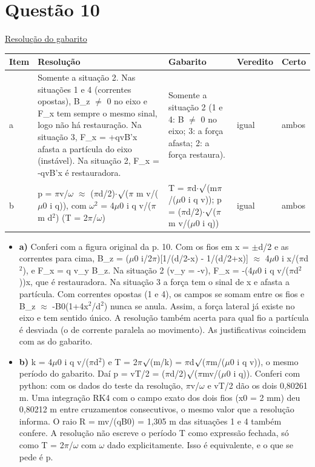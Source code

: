 \documentclass{article}%
\begin{document}
\section*{Questão 10}%
\href{https://poliedroresolve.sistemapoliedro.com.br/vestibulares/ime/2027/ime-2-fase-dia-2-27-10-2026-2-fase-dia-2/dissertativa-10-fisica-2-fase-dia-2-ime-2027}{Resolução do gabarito}\par\smallskip%
\begin{longtable}{@{}p{} p{} p{} p{} p{}@{}}\toprule Item & Resolução & Gabarito & Veredito & Certo \\ \midrule
a & Somente a situação 2. Nas situações 1 e 4 (correntes opostas), B\_z $\neq$ 0 no eixo e F\_x tem sempre o mesmo sinal, logo não há restauração. Na situação 3, F\_x = +qvB'x afasta a partícula do eixo (instável). Na situação 2, F\_x = -qvB'x é restauradora. & Somente a situação 2 (1 e 4: B $\neq$ 0 no eixo; 3: a força afasta; 2: a força restaura). & igual & ambos \\
b & p = $\pi$v/$\omega$ $\approx$ ($\pi$d/2)$\cdot$$\surd$($\pi$ m v/($\mu$0 i q)), com $\omega$$^2$ = 4$\mu$0 i q v/($\pi$ m d$^2$) (T = 2$\pi$/$\omega$) & T = $\pi$d$\cdot$$\surd$(m$\pi$/($\mu$0 i q v)); p = ($\pi$d/2)$\cdot$$\surd$($\pi$ m v/($\mu$0 i q)) & igual & ambos \\
\bottomrule\end{longtable}%
\begin{itemize}%
\item%
\textbf{a)} Conferi com a figura original da p. 10. Com os fios em x = $\pm$d/2 e as correntes para cima, B\_z = ($\mu$0 i/2$\pi$){[}1/(d/2-x) - 1/(d/2+x){]} $\approx$ 4$\mu$0 i x/($\pi$d$^2$), e F\_x = q v\_y B\_z. Na situação 2 (v\_y = -v), F\_x = -(4$\mu$0 i q v/($\pi$d$^2$))x, que é restauradora. Na situação 3 a força tem o sinal de x e afasta a partícula. Com correntes opostas (1 e 4), os campos se somam entre os fios e B\_z $\approx$ -B0(1+4x$^2$/d$^2$) nunca se anula. Assim, a força lateral já existe no eixo e tem sentido único. A resolução também acerta para qual fio a partícula é desviada (o de corrente paralela ao movimento). As justificativas coincidem com as do gabarito.%
\item%
\textbf{b)} k = 4$\mu$0 i q v/($\pi$d$^2$) e T = 2$\pi$$\surd$(m/k) = $\pi$d$\surd$($\pi$m/($\mu$0 i q v)), o mesmo período do gabarito. Daí p = vT/2 = ($\pi$d/2)$\surd$($\pi$mv/($\mu$0 i q)). Conferi com python: com os dados do teste da resolução, $\pi$v/$\omega$ e vT/2 dão os dois 0,80261 m. Uma integração RK4 com o campo exato dos dois fios (x0 = 2 mm) deu 0,80212 m entre cruzamentos consecutivos, o mesmo valor que a resolução informa. O raio R = mv/(qB0) = 1,305 m das situações 1 e 4 também confere. A resolução não escreve o período T como expressão fechada, só como T = 2$\pi$/$\omega$ com $\omega$ dado explicitamente. Isso é equivalente, e o que se pede é p.%
\end{itemize}%
\end{document}
